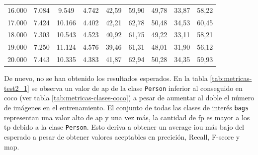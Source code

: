 \begin{table}[ht!]
\begin{tabular}{lcccccccc}
16.000              & 7.084          & 9.549          & 4.742          & 42,59                                                             & 59,90                                                          & 49,78                                                           & 33,87                                                               & 58,22                                                             \\
17.000              & 7.424          & 10.166         & 4.402          & 42,21                                                             & 62,78                                                          & 50,48                                                           & 34,53                                                               & 60,45                                                             \\
18.000              & 7.303          & 10.543         & 4.523          & 40,92                                                             & 61,75                                                          & 49,22                                                           & 33,11                                                               & 58,21                                                             \\
19.000              & 7.250          & 11.124         & 4.576          & 39,46                                                             & 61,31                                                          & 48,01                                                           & 31,90                                                               & 56,12                                                             \\
20.000              & 7.443          & 10.335         & 4.383          & 41,87                                                             & 62,94                                                          & 50,28                                                           & 34,35                                                               & 59,93                                                             \\ \hline
\end{tabular}
\end{table}

De nuevo, no se han obtenido los resultados esperados. En la tabla \ref{tab:metricas-test2_1} se observa un valor de \gls{ap} de la clase \texttt{Person} inferior al conseguido en \gls{coco} (ver tabla \ref{tab:metricas-clases-coco}) a pesar de aumentar al doble el número de imágenes en el entrenamiento. El conjunto de todas las clases de interés \texttt{bags} representan una valor alto de \gls{ap} y una vez más, la cantidad de \gls{fp} es mayor a los \gls{tp} debido a la clase \texttt{Person}. Esto deriva a obtener un average \gls{iou} más bajo del esperado a pesar de obtener valores aceptables en precición, Recall, F-score y \gls{map}.

